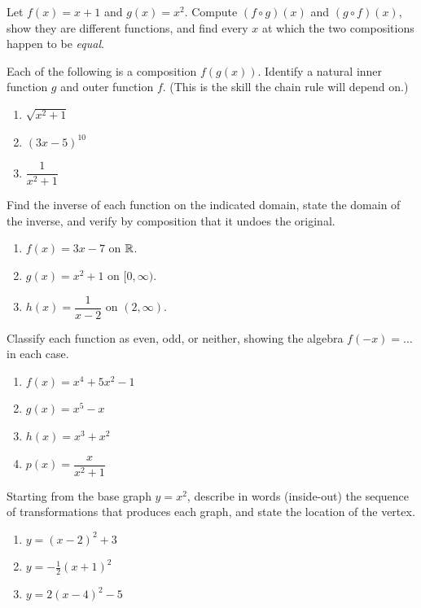 \begin{exercise}
\label{ch02:exc-composition}
Let $f(x) = x + 1$ and $g(x) = x^2$. Compute $(f\circ g)(x)$ and $(g\circ f)(x)$,
show they are different functions, and find every $x$ at which the two compositions
happen to be \emph{equal}.
\end{exercise}

\begin{exercise}
\label{ch02:exc-decompose}
Each of the following is a composition $f(g(x))$. Identify a natural inner function
$g$ and outer function $f$. (This is the skill the chain rule will depend on.)
\begin{enumerate}
  \item $\sqrt{x^2 + 1}$
  \item $(3x - 5)^{10}$
  \item $\dfrac{1}{x^2 + 1}$
\end{enumerate}
\end{exercise}

\begin{exercise}
\label{ch02:exc-inverses}
Find the inverse of each function on the indicated domain, state the domain of the
inverse, and verify by composition that it undoes the original.
\begin{enumerate}
  \item $f(x) = 3x - 7$ on $\mathbb{R}$.
  \item $g(x) = x^2 + 1$ on $[0, \infty)$.
  \item $h(x) = \dfrac{1}{x - 2}$ on $(2, \infty)$.
\end{enumerate}
\end{exercise}

\begin{exercise}
\label{ch02:exc-even-odd}
Classify each function as even, odd, or neither, showing the algebra
$f(-x) = \ldots$ in each case.
\begin{enumerate}
  \item $f(x) = x^4 + 5x^2 - 1$
  \item $g(x) = x^5 - x$
  \item $h(x) = x^3 + x^2$
  \item $p(x) = \dfrac{x}{x^2 + 1}$
\end{enumerate}
\end{exercise}

\begin{exercise}[Transformations]
\label{ch02:exc-transform}
Starting from the base graph $y = x^2$, describe in words (inside-out) the sequence
of transformations that produces each graph, and state the location of the vertex.
\begin{enumerate}
  \item $y = (x - 2)^2 + 3$
  \item $y = -\tfrac{1}{2}(x + 1)^2$
  \item $y = 2(x - 4)^2 - 5$
\end{enumerate}
\end{exercise}

